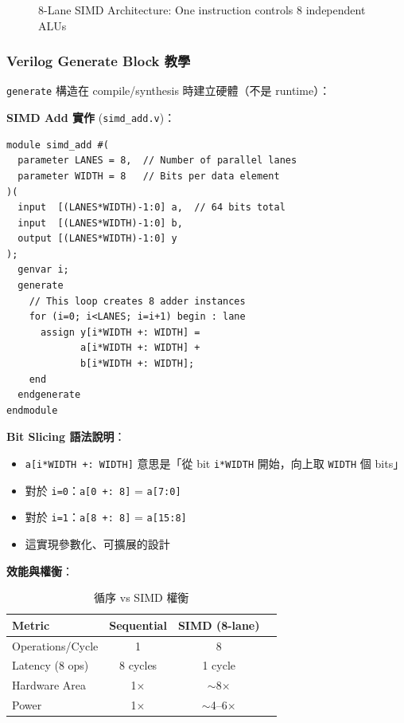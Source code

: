 \documentclass[journal]{IEEEtran}
\begin{document}
\begin{figure}[!t]
\centering
{}
\caption{8-Lane SIMD Architecture: One instruction controls 8 independent ALUs}
\label{fig:simd}
\end{figure}

\subsubsection{Verilog Generate Block 教學}
\texttt{generate} 構造在 compile/synthesis 時建立硬體（不是 runtime）：

\textbf{SIMD Add 實作} (\texttt{simd\_add.v})：
\begin{lstlisting}
module simd_add #(
  parameter LANES = 8,  // Number of parallel lanes
  parameter WIDTH = 8   // Bits per data element
)(
  input  [(LANES*WIDTH)-1:0] a,  // 64 bits total
  input  [(LANES*WIDTH)-1:0] b,
  output [(LANES*WIDTH)-1:0] y
);
  genvar i;
  generate
    // This loop creates 8 adder instances
    for (i=0; i<LANES; i=i+1) begin : lane
      assign y[i*WIDTH +: WIDTH] = 
             a[i*WIDTH +: WIDTH] + 
             b[i*WIDTH +: WIDTH];
    end
  endgenerate
endmodule
\end{lstlisting}

\textbf{Bit Slicing 語法說明}：
\begin{itemize}
    \item \texttt{a[i*WIDTH +: WIDTH]} 意思是「從 bit \texttt{i*WIDTH} 開始，向上取 \texttt{WIDTH} 個 bits」
    \item 對於 \texttt{i=0}：\texttt{a[0 +: 8]} = \texttt{a[7:0]}
    \item 對於 \texttt{i=1}：\texttt{a[8 +: 8]} = \texttt{a[15:8]}
    \item 這實現參數化、可擴展的設計
\end{itemize}

\textbf{效能與權衡}：
\begin{table}[!t]
\centering
\caption{循序 vs SIMD 權衡}
\footnotesize
\begin{tabular}{@{}lccc@{}}
\toprule
\textbf{Metric} & \textbf{Sequential} & \textbf{SIMD (8-lane)} \\
\midrule
Operations/Cycle & 1 & 8 \\
Latency (8 ops) & 8 cycles & 1 cycle \\
Hardware Area & 1$\times$ & $\sim$8$\times$ \\
Power & 1$\times$ & $\sim$4--6$\times$ \\
\bottomrule
\end{tabular}
\end{table}
\end{document}

